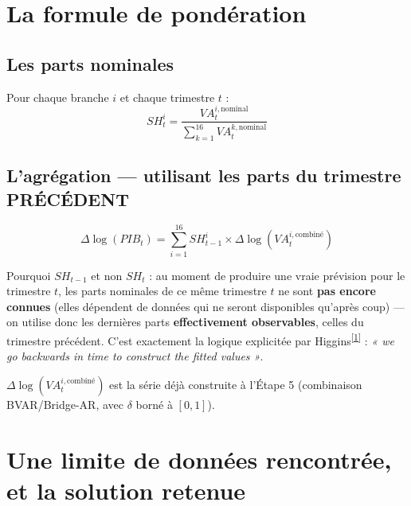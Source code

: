 \documentclass[11pt,a4paper]{article}
\newcommand{\cit}[1]{\textsuperscript{\hyperlink{ref#1}{[#1]}}}
\begin{document}
\section{La formule de pondération}

\subsection{Les parts nominales}

Pour chaque branche $i$ et chaque trimestre $t$ :
\begin{equation}
SH_t^i = \frac{VA_t^{i,\text{nominal}}}{\sum_{k=1}^{16} VA_t^{k,\text{nominal}}}
\label{eq:part_nominale}
\end{equation}

\subsection{L'agrégation --- utilisant les parts du trimestre PRÉCÉDENT}

\begin{equation}
\Delta\log(PIB_t) = \sum_{i=1}^{16} SH_{t-1}^i \times \Delta\log(VA_t^{i,\text{combiné}})
\label{eq:aggregation}
\end{equation}

\begin{definitionbox}
Pourquoi $SH_{t-1}$ et non $SH_t$ : au moment de produire une vraie prévision pour le trimestre $t$, les parts nominales de ce même trimestre $t$ ne sont \textbf{pas encore connues} (elles dépendent de données qui ne seront disponibles qu'après coup) --- on utilise donc les dernières parts \textbf{effectivement observables}, celles du trimestre précédent. C'est exactement la logique explicitée par Higgins\cit{1} : \textit{« we go backwards in time to construct the fitted values »}.
\end{definitionbox}

$\Delta\log(VA_t^{i,\text{combiné}})$ est la série déjà construite à l'Étape 5 (combinaison BVAR/Bridge-AR, avec $\delta$ borné à $[0,1]$).

\section{Une limite de données rencontrée, et la solution retenue}
\end{document}
